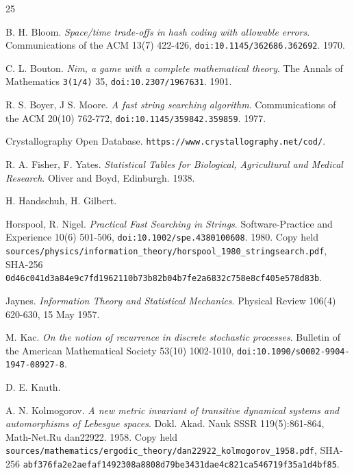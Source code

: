 \begin{thebibliography}{25}

B. H. Bloom. \emph{Space/time trade-offs in hash coding with allowable errors}. Communications of the ACM 13(7) 422-426, \texttt{doi:10.1145/\allowbreak{}362686.362692}. 1970.

C. L. Bouton. \emph{Nim, a game with a complete mathematical theory}. The Annals of Mathematics \texttt{3(1/\allowbreak{}4)} 35, \texttt{doi:10.2307/\allowbreak{}1967631}. 1901.

R. S. Boyer, J S. Moore. \emph{A fast string searching algorithm}. Communications of the ACM 20(10) 762-772, \texttt{doi:10.1145/\allowbreak{}359842.359859}. 1977.

Crystallography Open Database. \texttt{https:/\allowbreak{}/\allowbreak{}www.crystallography.net/\allowbreak{}cod/\allowbreak{}}.

R. A. Fisher, F. Yates. \emph{Statistical Tables for Biological, Agricultural and Medical Research}. Oliver and Boyd, Edinburgh. 1938.

H. Handschuh, H. Gilbert.

Horspool, R. Nigel. \emph{Practical Fast Searching in Strings}. Software-Practice and Experience 10(6) 501-506, \texttt{doi:10.1002/\allowbreak{}spe.4380100608}. 1980.\newline
{\footnotesize Copy held \texttt{sources/\allowbreak{}physics/\allowbreak{}information\_\allowbreak{}theory/\allowbreak{}horspool\_\allowbreak{}1980\_\allowbreak{}stringsearch.pdf}, SHA-256 \texttt{0d46c041d3a84e9c7fd1962110b73b82b04b7fe2a6832c758e8cf405e578d83b}.}

Jaynes. \emph{Information Theory and Statistical Mechanics}. Physical Review 106(4) 620-630, 15 May 1957.

M. Kac. \emph{On the notion of recurrence in discrete stochastic processes}. Bulletin of the American Mathematical Society 53(10) 1002-1010, \texttt{doi:10.1090/\allowbreak{}s0002-9904-1947-08927-8}.

D. E. Knuth.

A. N. Kolmogorov. \emph{A new metric invariant of transitive dynamical systems and automorphisms of Lebesgue spaces}. Dokl. Akad. Nauk SSSR 119(5):861-864, Math-Net.Ru dan22922. 1958.\newline
{\footnotesize Copy held \texttt{sources/\allowbreak{}mathematics/\allowbreak{}ergodic\_\allowbreak{}theory/\allowbreak{}dan22922\_\allowbreak{}kolmogorov\_\allowbreak{}1958.pdf}, SHA-256 \texttt{abf376fa2e2aefaf1492308a8808d79be3431dae4c821ca546719f35a1d4bf85}.}


\end{thebibliography}
